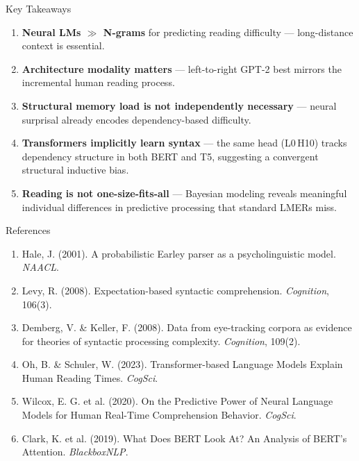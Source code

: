 \documentclass[aspectratio=169]{beamer}
\begin{document}
\begin{frame}{Key Takeaways}

  \begin{enumerate}
    \setlength\itemsep{0.6em}
    \item \textbf{Neural LMs $\gg$ N-grams} for predicting reading difficulty —
          long-distance context is essential.

    \item \textbf{Architecture modality matters} — left-to-right GPT-2 best
          mirrors the incremental human reading process.

    \item \textbf{Structural memory load is not independently necessary} —
          neural surprisal already encodes dependency-based difficulty.

    \item \textbf{Transformers implicitly learn syntax} — the same head
          (L0\,H10) tracks dependency structure in both BERT and T5,
          suggesting a convergent structural inductive bias.

    \item \textbf{Reading is not one-size-fits-all} — Bayesian modeling
          reveals meaningful individual differences in predictive processing
          that standard LMERs miss.
  \end{enumerate}
\end{frame}

\begin{frame}{References}
  \footnotesize
  \begin{enumerate}
    \item Hale, J. (2001). A probabilistic Earley parser as a psycholinguistic model. \textit{NAACL}.
    \item Levy, R. (2008). Expectation-based syntactic comprehension. \textit{Cognition}, 106(3).
    \item Demberg, V. \& Keller, F. (2008). Data from eye-tracking corpora as evidence for theories of syntactic processing complexity. \textit{Cognition}, 109(2).
    \item Oh, B. \& Schuler, W. (2023). Transformer-based Language Models Explain Human Reading Times. \textit{CogSci}.
    \item Wilcox, E. G. et al. (2020). On the Predictive Power of Neural Language Models for Human Real-Time Comprehension Behavior. \textit{CogSci}.
    \item Clark, K. et al. (2019). What Does BERT Look At? An Analysis of BERT's Attention. \textit{BlackboxNLP}.
  \end{enumerate}
\end{frame}
\end{document}
